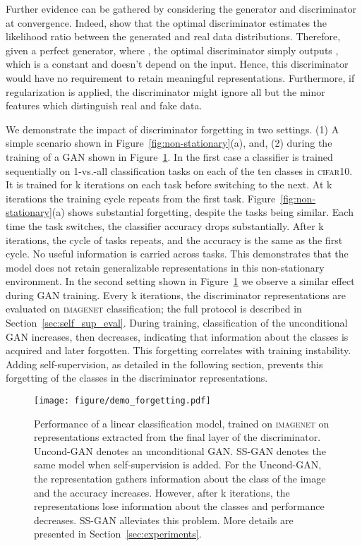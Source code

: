 \documentclass[10pt,twocolumn,letterpaper]{article}
\newcommand{\imagenet}{\textsc{imagenet}}
\begin{document}
Further evidence can be gathered by considering the generator and discriminator at convergence. Indeed, \citet{goodfellow2014generative} show that the optimal discriminator estimates the likelihood ratio between the generated and real data distributions. Therefore, given a perfect generator, where , the optimal discriminator simply outputs , which is a constant and doesn't depend on the input. Hence, this discriminator would have no requirement to retain meaningful representations. Furthermore, if regularization is applied, the discriminator might ignore all but the minor features which distinguish real and fake data.

We demonstrate the impact of discriminator forgetting in two settings.
(1) A simple scenario shown in Figure~\ref{fig:non-stationary}(a), and,
(2) during the training of a GAN shown in Figure~\ref{fig:gan_forget}.
In the first case a classifier is trained sequentially on 1-vs.-all classification tasks on each of the ten classes in \textsc{cifar10}. It is trained for k iterations on each task before switching to the next. At k iterations the training cycle repeats from the first task. Figure~\ref{fig:non-stationary}(a) shows substantial forgetting, despite the tasks being similar.
Each time the task switches, the classifier accuracy drops substantially.
After k iterations, the cycle of tasks repeats, and the accuracy is the same as the first cycle.
No  useful information is carried across tasks.
This demonstrates that the model does not retain generalizable representations in this non-stationary environment. In the second setting shown in Figure~\ref{fig:gan_forget} we observe a similar effect during GAN training. Every k iterations, the discriminator representations are evaluated on \imagenet{} classification; the full protocol is described in Section~\ref{sec:self_sup_eval}.
During training, classification of the unconditional GAN increases, then decreases, indicating that information about the classes is acquired and later forgotten.
This forgetting correlates with training instability.
Adding self-supervision, as detailed in the following section, prevents this forgetting of the classes in the discriminator representations.

\begin{figure}[t]
  \centering
  \texttt{[image: figure/demo\_forgetting.pdf]}
  \caption{
  \label{fig:gan_forget}
  Performance of a linear classification model, trained on \imagenet{} on representations extracted from the final layer of the discriminator.
  Uncond-GAN denotes an unconditional GAN. SS-GAN denotes the same model when self-supervision is added. For the Uncond-GAN, the representation gathers information about the class of the image and the accuracy increases.
  However, after k iterations, the representations lose information about the classes and performance decreases.
  SS-GAN alleviates this problem. More details are presented in Section~\ref{sec:experiments}.}
\end{figure}
\end{document}

